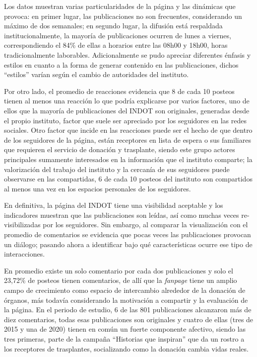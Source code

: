 \documentclass[spanish]{textolivre}
\begin{document}
Los datos muestran varias particularidades de la página y las dinámicas que provoca: en primer lugar, las publicaciones no son frecuentes, considerando un máximo de dos semanales; en segundo lugar, la difusión está respaldada institucionalmente, la mayoría de publicaciones ocurren de lunes a viernes, correspondiendo el 84\% de ellas a horarios entre las 08h00 y 18h00, horas tradicionalmente laborables. Adicionalmente se pudo apreciar diferentes énfasis y estilos en cuanto a la forma de generar contenido en las publicaciones, dichos “estilos” varían según el cambio de autoridades del instituto.

Por otro lado, el promedio de reacciones evidencia que 8 de cada 10 posteos tienen al menos una reacción lo que podría explicarse por varios factores, uno de ellos que la mayoría de publicaciones del INDOT son originales, generadas desde el propio instituto, factor que suele ser apreciado por los seguidores en las redes sociales. Otro factor que incide en las reacciones puede ser el hecho de que dentro de los seguidores de la página, están receptores en lista de espera o sus familiares que requieren el servicio de donación y trasplante, siendo este grupo actores principales sumamente interesados en la información que el instituto comparte; la valorización del trabajo del instituto y la cercanía de sus seguidores puede observarse en las compartidas, 6 de cada 10 posteos del instituto son compartidos al menos una vez en los espacios personales de los seguidores.  

En definitiva, la página del INDOT tiene una visibilidad aceptable y los indicadores muestran que las publicaciones son leídas, así como muchas veces re-visibilizadas por los seguidores. Sin embargo, al comparar la visualización con el promedio de comentarios se evidencia que pocas veces las publicaciones provocan un diálogo; pasando ahora a identificar bajo qué características ocurre ese tipo de interacciones.

En promedio existe un solo comentario por cada dos publicaciones y solo el 23,72\% de posteos tienen comentarios, de allí que la \emph{fanpage} tiene un amplio campo de crecimiento como espacio de intercambio alrededor de la donación de órganos, más todavía considerando la motivación a compartir y la evaluación de la página. En el periodo de estudio, 6 de las 801 publicaciones alcanzaron más de diez comentarios, todas esas publicaciones son originales y cuatro de ellas (tres de 2015 y una de 2020) tienen en común un fuerte componente afectivo, siendo las tres primeras, parte de la campaña “Historias que inspiran” que da un rostro a los receptores de trasplantes, socializando como la donación cambia vidas reales. 
\end{document}
